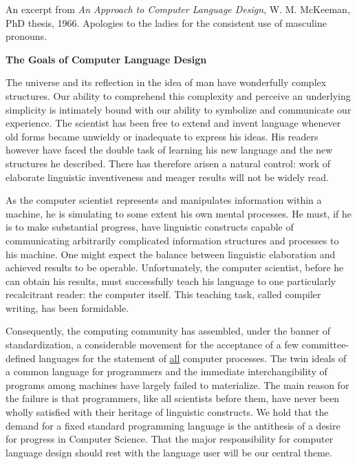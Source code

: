 





\vspace{1em}

\begin{small}
\noindent An excerpt from {\em An Approach to Computer Language Design},
W. M. McKeeman, PhD thesis, 1966.  
Apologies to the ladies for the consistent use of masculine pronouns.
\end{small}
\vspace{2em}

\begin{center}
      {\large \bf The Goals of Computer Language Design}
\end{center}

\vspace{1em}

The universe and its reflection in the idea of man have wonderfully 
complex structures.
Our ability to comprehend this complexity and perceive 
an underlying simplicity is intimately bound with our ability to 
symbolize and communicate our experience.
The scientist has been free to extend and invent language 
whenever old forms became unwieldy or inadequate to express his ideas.
His readers however have faced the double task of 
learning his new language and the new structures he described.
There has therefore arisen a natural control: 
work of elaborate linguistic inventiveness and meager results 
will not be widely read.

As the computer scientist represents and manipulates information 
within a machine,
he is simulating to some extent his own mental processes.
He must, if he is to make substantial progress, 
have linguistic constructs capable of communicating arbitrarily 
complicated information structures and processes to his machine.
One might expect the balance between linguistic elaboration and 
achieved results to be operable.
Unfortunately, the computer scientist, before he can obtain his results,
must successfully teach his language to one particularly recalcitrant 
reader: the computer itself.
This teaching task, called compiler writing, has been formidable.

Consequently, the computing community has assembled, 
under the banner of standardization, 
a considerable movement for the acceptance of a 
few committee-defined languages for the statement of 
\underline{all} computer processes.
The twin ideals of a common language for programmers and the immediate
interchangibility of programs 
among machines have largely failed to materialize.
The main reason for the failure is that programmers, 
like all scientists before them, 
have never been wholly satisfied with their heritage of linguistic constructs.
We hold that the demand for a fixed standard programming language 
is the antithesis of a desire for progress in Computer Science.
That the major responsibility for computer language design should rest 
with the language user will be our central theme.


